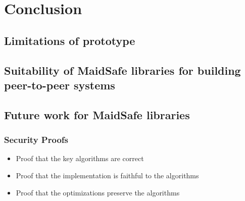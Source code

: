 \chapter{Conclusion}

\section{Limitations of prototype}

\section{Suitability of MaidSafe libraries for building peer-to-peer systems}

\section{Future work for MaidSafe libraries}

\subsection{Security Proofs}
\begin{itemize}
	\item Proof that the key algorithms are correct
	\item Proof that the implementation is faithful to the algorithms
	\item Proof that the optimizations preserve the algorithms
\end{itemize}
